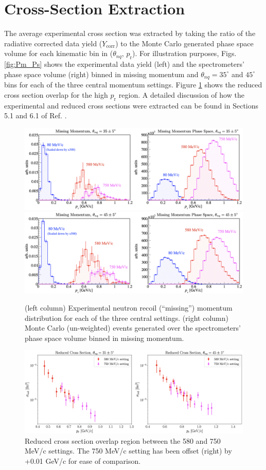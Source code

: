 \documentclass[aps, prl]{revtex4-2}  %
\begin{document}
\section{\large Cross-Section Extraction}
\indent The average experimental cross section was extracted by taking the ratio of the radiative corrected data yield ($Y_{\mathrm{corr}}$) to the Monte Carlo generated phase space volume for each
kinematic bin in ($\theta_{nq}$, $p_{\mathrm{r}}$). For illustration purposes, Figs. \ref{fig:Pm_Ps} shows the experimental data yield (left) and the spectrometers' phase space volume (right) binned in
missing momentum and $\theta_{nq} = 35^{\circ}$ and  $45^{\circ}$ bins for each of the three central momentum settings. Figure \ref{fig:RedXsec_overlap} shows the reduced cross section overlap for the high
$p_{\mathrm{r}}$ region. A detailed discussion of how the experimental and reduced cross sections were extracted can be
found in Sections 5.1 and 6.1 of Ref. \cite{cyero_phdthesis}.
\begin{figure}[!h]
\includegraphics[scale=0.29]{Pr_and_Ps_35deg.png}
\includegraphics[scale=0.29]{Pr_and_Ps_45deg.png}
\caption{(left column) Experimental neutron recoil (``missing'') momentum distribution for each of the three central settings. (right column) Monte Carlo (un-weighted) events generated over
  the spectrometers' phase space volume binned in missing momentum.}
\label{fig:Pm_Ps}
\includegraphics[scale=0.23]{RedXsec_overlap.png}
\caption{Reduced cross section overlap region between the 580 and 750 MeV/c settings. The 750 MeV/c setting has been offset (right) by +0.01 GeV/c for ease of comparison.}
\label{fig:RedXsec_overlap}
\end{figure}
\end{document}
